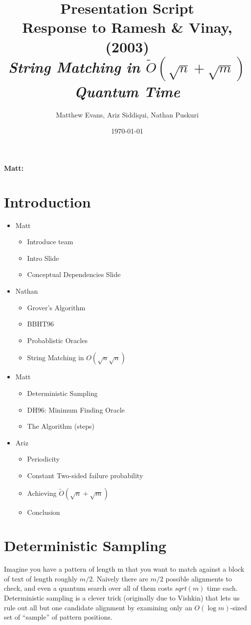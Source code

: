 \documentclass[11pt]{article}
\title{Presentation Script \\ 
\Large{Response to Ramesh \& Vinay, (2003)\\ 
\small{\textit{String Matching in \(\tilde{O}(\sqrt{n} + \sqrt{m})\) Quantum Time}} }}
\author{%
\normalsize{Matthew Evans, Ariz Siddiqui, Nathan Puskuri}
}
\date{\today}
\begin{document}
\maketitle

\textbf{Matt:}
\section*{Introduction}
\begin{itemize}
  \item Matt
        \begin{itemize}
          \item Introduce team
          \item Intro Slide
          \item Conceptual Dependencies Slide
        \end{itemize}
  \item Nathan \begin{itemize}
          \item Grover's Algorithm
          \item BBHT96
          \item Probablistic Oracles
          \item String Matching in \(O(\sqrt{n} \sqrt{n})\)
        \end{itemize}
  \item Matt \begin{itemize}
          \item Deterministic Sampling
          \item DH96: Minimum Finding Oracle
          \item The Algorithm (steps)
        \end{itemize}
  \item Ariz \begin{itemize}
          \item Periodicity
          \item Constant Two-sided failure probability
          \item Achieving \(\tilde{O}(\sqrt{n} + \sqrt{m})\)
          \item Conclusion
        \end{itemize}
\end{itemize}

\section*{Deterministic Sampling}
Imagine you have a pattern of length m that you want to match against a block of text of length roughly \(m/2\). Naively there are \(m/2\) possible alignments to check, and even a quantum search over all of them costs \(sqrt(m)\) time each. Deterministic sampling is a clever trick (originally due to Vishkin) that lets us rule out all but one candidate alignment by examining only an \(O(\log m)\)-sized set of ``sample'' of pattern positions.
\end{document}
